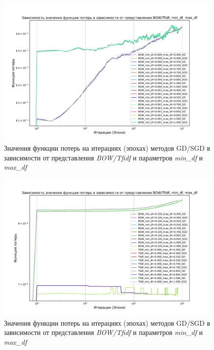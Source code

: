 \documentclass[14pt]{extarticle}
\begin{document}
\begin{figure}[H]
    \centering
    \includegraphics[width=0.85\linewidth]
    {exp_8_min_max_df_loss_2.pdf}
    \caption{Значения функции потерь на итерациях (эпохах) методов GD/SGD в зависимости от представления \textit{BOW/Tfidf} и параметров \textit{min\_df} и \textit{max\_df}}
    \label{fig:exp_8_min_max_df_loss_2}
\end{figure}

\begin{figure}[H]
    \centering
    \includegraphics[width=0.85\linewidth]
    {exp_8_min_max_df_loss_3.pdf}
    \caption{Значения функции потерь на итерациях (эпохах) методов GD/SGD в зависимости от представления \textit{BOW/Tfidf} и параметров \textit{min\_df} и \textit{max\_df}}
    \label{fig:exp_8_min_max_df_loss_3}
\end{figure}
\end{document}
